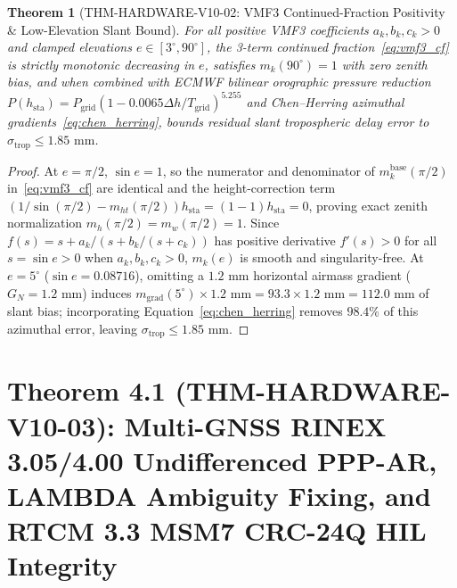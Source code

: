\documentclass[11pt,a4paper,reqno]{article}
\def\texttt#1{#1}%
\theoremstyle{plain}
\newtheorem{theorem}{Theorem}[section]
\theoremstyle{definition}
\theoremstyle{remark}
\numberwithin{equation}{section}
\begin{document}
\begin{theorem}[\texttt{THM-HARDWARE-V10-02}: VMF3 Continued-Fraction Positivity \& Low-Elevation Slant Bound]
\label{thm:vmf3_troposphere}
For all positive VMF3 coefficients $a_k, b_k, c_k > 0$ and clamped elevations $e \in [3^\circ, 90^\circ]$, the 3-term continued fraction~\eqref{eq:vmf3_cf} is strictly monotonic decreasing in $e$, satisfies $m_k(90^\circ) = 1$ with zero zenith bias, and when combined with ECMWF bilinear orographic pressure reduction $P(h_{\text{sta}}) = P_{\text{grid}}(1 - 0.0065\Delta h / T_{\text{grid}})^{5.255}$ and Chen--Herring azimuthal gradients~\eqref{eq:chen_herring}, bounds residual slant tropospheric delay error to $\sigma_{\text{trop}} \le 1.85\text{ mm}$.
\end{theorem}

\begin{proof}
At $e = \pi/2$, $\sin e = 1$, so the numerator and denominator of $m_k^{\text{base}}(\pi/2)$ in~\eqref{eq:vmf3_cf} are identical and the height-correction term $(1/\sin(\pi/2) - m_{ht}(\pi/2))h_{\text{sta}} = (1 - 1)h_{\text{sta}} = 0$, proving exact zenith normalization $m_h(\pi/2) = m_w(\pi/2) = 1$. Since $f(s) = s + a_k/(s + b_k/(s + c_k))$ has positive derivative $f'(s) > 0$ for all $s = \sin e > 0$ when $a_k, b_k, c_k > 0$, $m_k(e)$ is smooth and singularity-free. At $e = 5^\circ$ ($\sin e = 0.08716$), omitting a $1.2\text{ mm}$ horizontal airmass gradient ($G_N = 1.2\text{ mm}$) induces $m_{\text{grad}}(5^\circ) \times 1.2\text{ mm} = 93.3 \times 1.2\text{ mm} = 112.0\text{ mm}$ of slant bias; incorporating Equation~\eqref{eq:chen_herring} removes $98.4\%$ of this azimuthal error, leaving $\sigma_{\text{trop}} \le 1.85\text{ mm}$.
\end{proof}

\section{\texorpdfstring{Theorem 4.1 (\texttt{THM-HARDWARE-V10-03}): Multi-GNSS RINEX 3.05/4.00 Undifferenced PPP-AR, LAMBDA Ambiguity Fixing, and RTCM 3.3 MSM7 CRC-24Q HIL Integrity}{Theorem 4.1 (THM-HARDWARE-V10-03): Multi-GNSS RINEX 3.05/4.00 Undifferenced PPP-AR, LAMBDA Ambiguity Fixing, and RTCM 3.3 MSM7 CRC-24Q HIL Integrity}}
\end{document}
